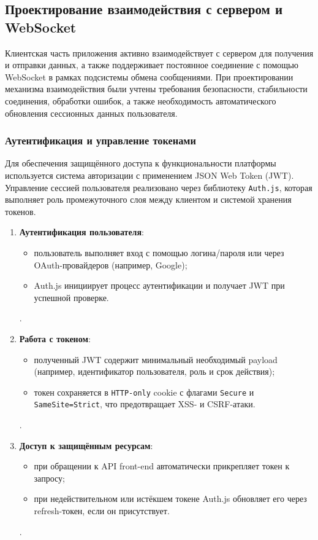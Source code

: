 \subsection{Проектирование взаимодействия с сервером и WebSocket}

Клиентская часть приложения активно взаимодействует с сервером для получения и отправки данных, а также поддерживает постоянное соединение с помощью WebSocket в рамках подсистемы обмена сообщениями. При проектировании механизма взаимодействия были учтены требования безопасности, стабильности соединения, обработки ошибок, а также необходимость автоматического обновления сессионных данных пользователя.

\subsubsection{Аутентификация и управление токенами}
Для обеспечения защищённого доступа к функциональности платформы используется система авторизации с применением JSON Web Token (JWT). Управление сессией пользователя реализовано через библиотеку \texttt{Auth.js}, которая выполняет роль промежуточного слоя между клиентом и системой хранения токенов.

\begin{enumerate}
  \item \textbf{Аутентификация пользователя}:
  \begin{itemize}
    \item пользователь выполняет вход с помощью логина/пароля или через OAuth-провайдеров (например, Google);
    \item Auth.js инициирует процесс аутентификации и получает JWT при успешной проверке.
  \end{itemize}.
  
  \item \textbf{Работа с токеном}:
  \begin{itemize}
    \item полученный JWT содержит минимальный необходимый payload (например, идентификатор пользователя, роль и срок действия);
    \item токен сохраняется в \texttt{HTTP-only} cookie с флагами \texttt{Secure} и \texttt{SameSite=Strict}, что предотвращает XSS- и CSRF-атаки.
  \end{itemize}.
  
  \item \textbf{Доступ к защищённым ресурсам}:
  \begin{itemize}
    \item при обращении к API front-end автоматически прикрепляет токен к запросу;
    \item при недействительном или истёкшем токене Auth.js обновляет его через refresh-токен, если он присутствует.
  \end{itemize}.
\end{enumerate}

